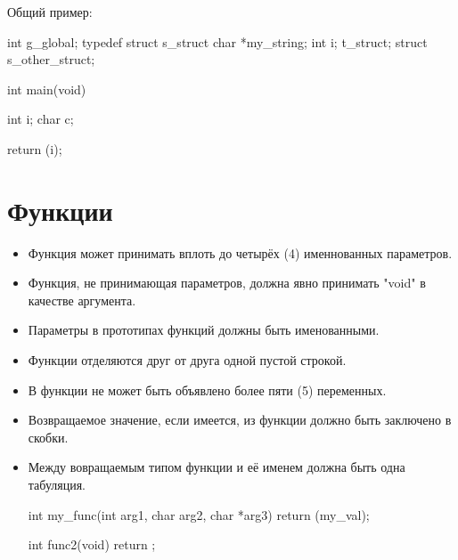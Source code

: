 \documentclass{42-ru}
\begin{document}
            \newpage

            Общий пример:
            \begin{42ccode}
int             g_global;
typedef struct  s_struct
{
    char    *my_string;
    int     i;
}               t_struct;
struct          s_other_struct;

int     main(void)
{
    int     i;
    char    c;

    return (i);
}
            \end{42ccode}
            \newpage

    \section{Функции}

        \begin{itemize}

            \item Функция может принимать вплоть до четырёх (4) именнованных параметров.

            \item Функция, не принимающая параметров, должна явно принимать "void" в качестве аргумента.

            \item Параметры в прототипах функций должны быть именованными.

            \item Функции отделяются друг от друга одной пустой строкой.

            \item В функции не может быть объявлено более пяти (5) переменных.

            \item Возвращаемое значение, если имеется, из функции должно быть заключено в скобки. 

            \item Между вовращаемым типом функции и её именем должна быть одна табуляция.

            \begin{42ccode}
int my_func(int arg1, char arg2, char *arg3)
{
    return (my_val);
}

int func2(void)
{
    return ;
}
            \end{42ccode}

        \end{itemize}
        \newpage
\end{document}
